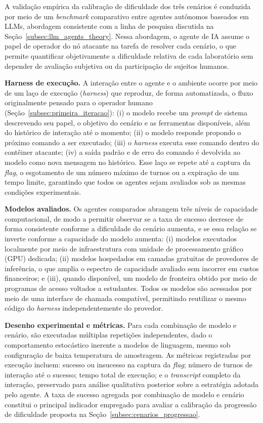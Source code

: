 \documentclass[conference]{IEEEtran}
\begin{document}
A validação empírica da calibração de dificuldade dos três cenários é conduzida por meio de um \textit{benchmark} comparativo entre agentes autônomos baseados em LLMs, abordagem consistente com a linha de pesquisa discutida na Seção~\ref{subsec:llm_agents_theory}. Nessa abordagem, o agente de IA assume o papel de operador do nó atacante na tarefa de resolver cada cenário, o que permite quantificar objetivamente a dificuldade relativa de cada laboratório sem depender de avaliação subjetiva ou da participação de sujeitos humanos.

\textbf{Harness de execução.} A interação entre o agente e o ambiente ocorre por meio de um laço de execução (\textit{harness}) que reproduz, de forma automatizada, o fluxo originalmente pensado para o operador humano (Seção~\ref{subsec:primeira_iteracao}): (i) o modelo recebe um \textit{prompt} de sistema descrevendo seu papel, o objetivo do cenário e as ferramentas disponíveis, além do histórico de interação até o momento; (ii) o modelo responde propondo o próximo comando a ser executado; (iii) o \textit{harness} executa esse comando dentro do contêiner atacante; (iv) a sa\'ida padrão e de erro do comando é devolvida ao modelo como nova mensagem no histórico. Esse laço se repete até a captura da \textit{flag}, o esgotamento de um número máximo de turnos ou a expiração de um tempo limite, garantindo que todos os agentes sejam avaliados sob as mesmas condições experimentais.

\textbf{Modelos avaliados.} Os agentes comparados abrangem três níveis de capacidade computacional, de modo a permitir observar se a taxa de sucesso decresce de forma consistente conforme a dificuldade do cenário aumenta, e se essa relação se inverte conforme a capacidade do modelo aumenta: (i) modelos executados localmente por meio de infraestrutura com unidade de processamento gráfico (GPU) dedicada; (ii) modelos hospedados em camadas gratuitas de provedores de inferência, o que amplia o espectro de capacidade avaliado sem incorrer em custos financeiros; e (iii), quando disponível, um modelo de fronteira obtido por meio de programas de acesso voltados a estudantes. Todos os modelos são acessados por meio de uma interface de chamada compatível, permitindo reutilizar o mesmo código do \textit{harness} independentemente do provedor.

\textbf{Desenho experimental e métricas.} Para cada combinação de modelo e cenário, são executadas múltiplas repetições independentes, dado o comportamento estocástico inerente a modelos de linguagem, mesmo sob configuração de baixa temperatura de amostragem. As métricas registradas por execução incluem: sucesso ou insucesso na captura da \textit{flag}; número de turnos de interação até o sucesso; tempo total de execução; e o \textit{transcript} completo da interação, preservado para análise qualitativa posterior sobre a estratégia adotada pelo agente. A taxa de sucesso agregada por combinação de modelo e cenário constitui o principal indicador empregado para avaliar a calibração da progressão de dificuldade proposta na Seção~\ref{subsec:cenarios_progressao}.
\end{document}
